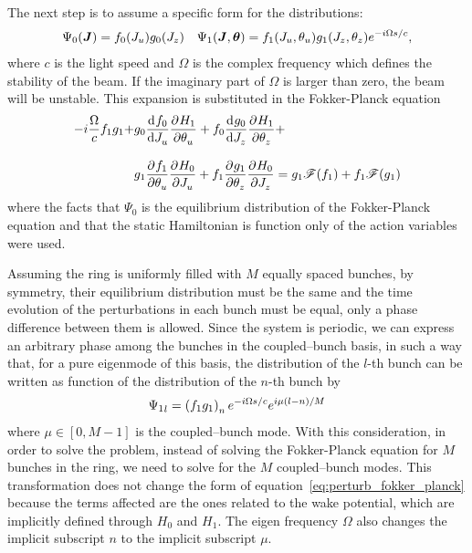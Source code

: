     The next step is to assume a specific form for the distributions:
    \begin{align}
        \Psi_0(\boldsymbol{J}) = f_0(J_u)g_0(J_z) && \Psi_1(\boldsymbol{J}, \boldsymbol{\theta}) = f_1(J_u, \theta_u)g_1(J_z, \theta_z)e^{-i\Omega s/c},
    \end{align}
    where $c$ is the light speed and $\Omega$ is the complex frequency which defines the stability of the beam. If the imaginary part of $\Omega$ is larger than zero, the beam will be unstable. This expansion is substituted in the Fokker-Planck equation
    \begin{align}\label{eq:perturb_fokker_planck}
        -i\frac{\Omega}{c}f_1g_1 +
        &g_0\frac{\mathrm{d}^{{}}f_0}{\mathrm{d} J_u^{{}}}\frac{\partial^{{}}H_1}{\partial \theta_u^{{}}} + f_0\frac{\mathrm{d}^{{}}g_0}{\mathrm{d} J_z^{{}}}\frac{\partial^{{}}H_1}{\partial \theta_z^{{}}} +\nonumber\\[3mm] &g_1\frac{\partial^{{}}f_1}{\partial \theta_u^{{}}}\frac{\partial^{{}}H_0}{\partial J_u^{{}}} +
        f_1\frac{\partial^{{}}g_1}{\partial \theta_z^{{}}}\frac{\partial^{{}}H_0}{\partial J_z^{{}}} = g_1\mathscr{F}(f_1) + f_1\mathscr{F}(g_1)
    \end{align}
    where the facts that $\Psi_0$ is the equilibrium distribution of the Fokker-Planck equation and that the static Hamiltonian is function only of the action variables were used.

    Assuming the ring is uniformly filled with $M$ equally spaced bunches, by symmetry, their equilibrium distribution must be the same and the time evolution of the perturbations in each bunch must be equal, only a phase difference between them is allowed. Since the system is periodic, we can express an arbitrary phase among the bunches in the coupled--bunch basis, in such a way that, for a pure eigenmode of this basis, the distribution of the $l$-th bunch can be written as function of the distribution of the $n$-th bunch by
    \begin{align}
        {\Psi_1}_l  = \left(f_1g_1\right)_ne^{-i\Omega s/c}e^{i\mu\left(l-n\right)/M}
    \end{align}
    where $\mu \in [0,M-1]$ is the coupled--bunch mode. With this consideration, in order to solve the problem, instead of solving the Fokker-Planck equation for $M$ bunches in the ring, we need to solve for the $M$ coupled--bunch modes. This transformation does not change the form of equation~\eqref{eq:perturb_fokker_planck} because the terms affected are the ones related to the wake potential, which are implicitly defined through $H_0$ and $H_1$. The eigen frequency $\Omega$ also changes the implicit subscript $n$ to the implicit subscript $\mu$.


